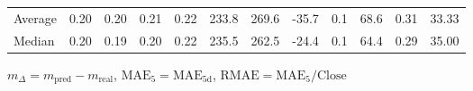 \begin{threeparttable}
{\begin{tabular}{lrrrrrrrrrrr}
Average &          0.20 &          0.20 &          0.21 &        0.22 &               233.8 &               269.6 &      -35.7 &                 0.1 &             68.6 &            0.31 &                  33.33 \\
 Median &          0.20 &          0.19 &          0.20 &        0.22 &               235.5 &               262.5 &      -24.4 &                 0.1 &             64.4 &            0.29 &                  35.00 \\
\bottomrule
\end{tabular}
}
\begin{tablenotes}\footnotesize
\item $m_\Delta=m_{\text{pred}}-m_{\text{real}}$,
$\mathrm{MAE}_5=\mathrm{MAE}_{5\text{d}}$,
$\mathrm{RMAE}=\mathrm{MAE}_5/\text{Close}$
\end{tablenotes}
\end{threeparttable}
\endgroup

